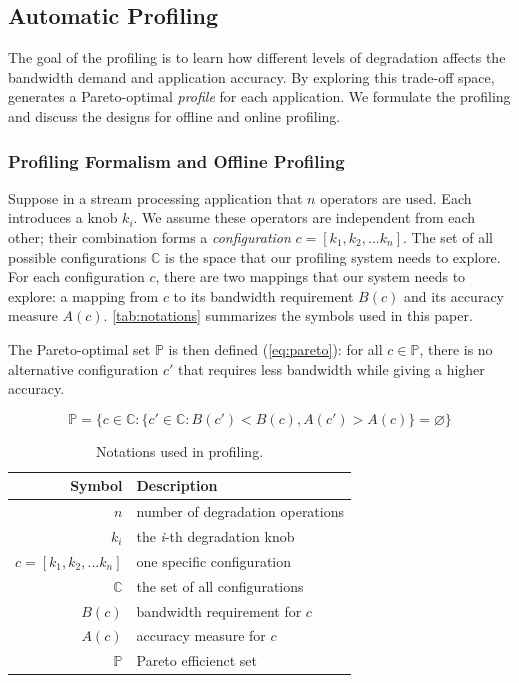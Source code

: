\subsection{Automatic Profiling}
\label{sec:automatic-profiling}

The goal of the profiling is to learn how different levels of degradation
affects the bandwidth demand and application accuracy. By exploring this
trade-off space, \sysname{} generates a Pareto-optimal \textit{profile} for each
application. We formulate the profiling and discuss the designs for offline and
online profiling.

\subsubsection{Profiling Formalism and Offline Profiling}
\label{sec:formalize-profiling}

Suppose in a stream processing application that $n$ \maybe{} operators are
used. Each introduces a knob $k_i$. We assume these operators are independent
from each other; their combination forms a \textit{configuration}
$c = [k_{1}, k_{2}, ... k_{n}]$. The set of all possible configurations
$\mathbb{C}$ is the space that our profiling system needs to explore. For each
configuration $c$, there are two mappings that our system needs to explore: a
mapping from $c$ to its bandwidth requirement $B(c)$ and its accuracy measure
$A(c)$. \autoref{tab:notations} summarizes the symbols used in this paper.

The Pareto-optimal set $\mathbb{P}$ is then defined (\autoref{eq:pareto}): for
all $c \in \mathbb{P}$, there is no alternative configuration $c'$ that requires
less bandwidth while giving a higher accuracy.

{\small
\begin{equation}
  \mathbb{P} = \{ c \in \mathbb{C} : \{ c' \in \mathbb{C}: B(c') < B(c),
  A(c') > A(c) \} = \varnothing\}
  \label{eq:pareto}
\end{equation}
}%

\begin{table}
  \centering
  \begin{tabular}{r l}
    \toprule
    \textbf{Symbol} & \textbf{Description} \\
    \midrule
    $n$ & number of degradation operations \\
    $k_i$ & the \textit{i}-th degradation knob \\
    $c = [k_{1}, k_{2}, ... k_{n}]$ & one specific configuration \\
    $\mathbb{C}$ & the set of all configurations \\
    \midrule
    $B(c)$ & bandwidth requirement for $c$ \\
    $A(c)$ & accuracy measure for $c$ \\
    $\mathbb{P}$ & Pareto efficienct set \\
    \bottomrule
  \end{tabular}
  \caption{Notations used in profiling.}
  \label{tab:notations}
\end{table}

